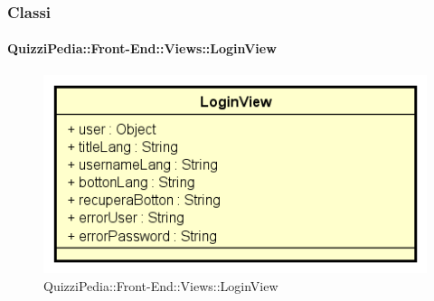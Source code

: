 \subsubsection{Classi}


\paragraph{QuizziPedia::Front-End::Views::LoginView}
\begin{figure} [ht]
	\centering
	\includegraphics[scale=0.45]{UML/Classi/Front-End/QuizziPedia_Front-end_Views_LoginView.png}
	\caption{QuizziPedia::Front-End::Views::LoginView}
\end{figure} \FloatBarrier
